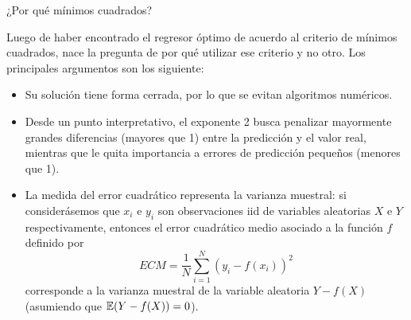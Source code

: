 \documentclass[handout, 9pt]{beamer}
\begin{document}
\begin{frame}{¿Por qué mínimos cuadrados?}

Luego de haber encontrado el regresor óptimo de acuerdo al criterio de mínimos cuadrados, nace la pregunta de por qué utilizar ese criterio y no otro. Los principales argumentos son los siguiente: \pause

\begin{itemize}
	\item Su solución tiene forma cerrada, por lo que se evitan algoritmos numéricos.\pause
	\item Desde un punto interpretativo, el exponente 2 busca penalizar mayormente grandes diferencias (mayores que 1) entre la predicción y el valor real, mientras que le quita importancia a errores de predicción pequeños (menores que 1).\pause
	\item La medida del error cuadrático representa la varianza muestral: si considerásemos que $x_i$ e $y_i$ son observaciones iid de variables aleatorias $X$ e $Y$ respectivamente, entonces el error cuadrático medio asociado a la función $f$ definido por
\begin{equation*}
	ECM = \frac{1}{N}\sum_{i=1}^N (y_i-f(x_i))^2
\end{equation*}
corresponde a la varianza muestral de la variable aleatoria $Y-f(X)$ (asumiendo que $\operatorname{\mathbb{E}}(Y-f(X))=0$).
\end{itemize}

\end{frame}
\end{document}
